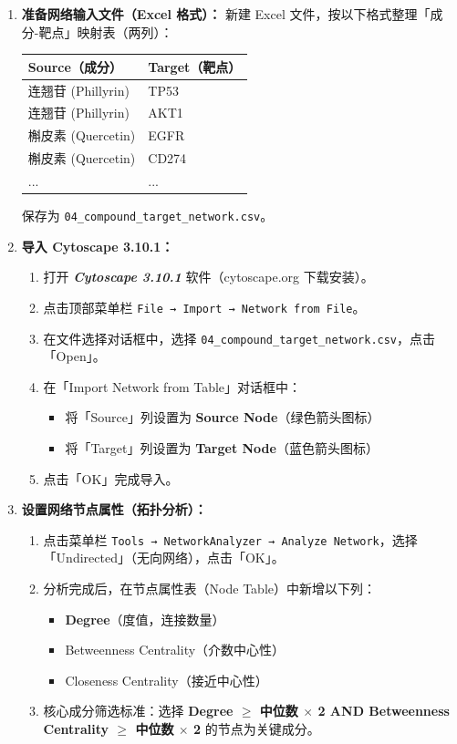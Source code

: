 \documentclass[12pt,a4paper,twoside]{article}
\newcommand{\software}[1]{\textbf{\textit{#1}}}
\newcommand{\clickpath}[1]{\texttt{#1}}
\begin{document}
\begin{enumerate}
  \item \textbf{准备网络输入文件（Excel 格式）：}
    新建 Excel 文件，按以下格式整理「成分-靶点」映射表（两列）：
    \begin{center}
    \begin{tabular}{ll}
    \toprule
    \textbf{Source（成分）} & \textbf{Target（靶点）} \\
    \midrule
    连翘苷 (Phillyrin) & TP53 \\
    连翘苷 (Phillyrin) & AKT1 \\
    槲皮素 (Quercetin) & EGFR \\
    槲皮素 (Quercetin) & CD274 \\
    ... & ... \\
    \bottomrule
    \end{tabular}
    \end{center}
    保存为 \texttt{04\_compound\_target\_network.csv}。

  \item \textbf{导入 Cytoscape 3.10.1：}
    \begin{enumerate}
      \item 打开 \software{Cytoscape 3.10.1} 软件（cytoscape.org 下载安装）。
      \item 点击顶部菜单栏 \clickpath{File → Import → Network from File}。
      \item 在文件选择对话框中，选择 \texttt{04\_compound\_target\_network.csv}，点击「Open」。
      \item 在「Import Network from Table」对话框中：
        \begin{itemize}
          \item 将「Source」列设置为 \textbf{Source Node}（绿色箭头图标）
          \item 将「Target」列设置为 \textbf{Target Node}（蓝色箭头图标）
        \end{itemize}
      \item 点击「OK」完成导入。
    \end{enumerate}

  \item \textbf{设置网络节点属性（拓扑分析）：}
    \begin{enumerate}
      \item 点击菜单栏 \clickpath{Tools → NetworkAnalyzer → Analyze Network}，选择「Undirected」（无向网络），点击「OK」。
      \item 分析完成后，在节点属性表（Node Table）中新增以下列：
        \begin{itemize}
          \item \textbf{Degree}（度值，连接数量）
          \item Betweenness Centrality（介数中心性）
          \item Closeness Centrality（接近中心性）
        \end{itemize}
      \item 核心成分筛选标准：选择 \textbf{Degree $\geq$ 中位数 $\times$ 2 AND Betweenness Centrality $\geq$ 中位数 $\times$ 2} 的节点为关键成分。
    \end{enumerate}


\end{enumerate}
\end{document}
